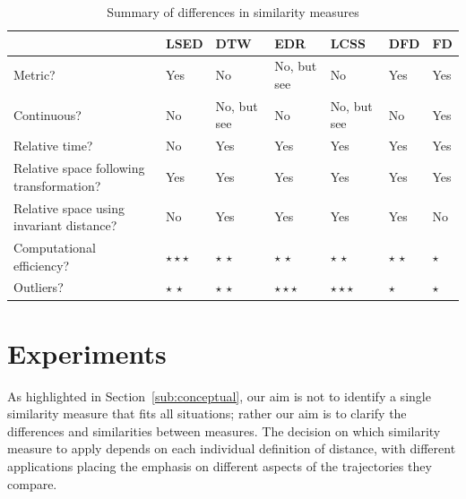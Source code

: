 \documentclass[10pt,letterpaper]{article}
\begin{document}
\begin{table}[htb]
    \caption{Summary of differences in similarity measures}\label{tab:key}
\renewcommand{\arraystretch}{2}
    \begin{tabular}{>{\raggedright\arraybackslash}p{2.8cm}|>{\raggedright\arraybackslash}p{1.25cm}>{\raggedright\arraybackslash}p{1.25cm}>{\raggedright\arraybackslash}p{1.25cm}>{\raggedright\arraybackslash}p{1.25cm}>{\raggedright\arraybackslash}p{1.25cm}p{1.25cm}}
~                                        & LSED     & DTW         & EDR         & LCSS        & DFD      & FD      \\ \hline
    Metric?                                  & Yes      & \cellcolor{gray!30}  No          & \cellcolor{gray!15} No, but see \cite{NgC04}& \cellcolor{gray!30} No          & Yes      & Yes     \\
    Continuous?                              & \cellcolor{gray!30} No       & \cellcolor{gray!15} No, but see \cite{b-cfdts-07} & \cellcolor{gray!30} No          & \cellcolor{gray!15} No, but see \cite{bbw-09} & \cellcolor{gray!30} No       & Yes     \\
    Relative time?                           & \cellcolor{gray!30} No       & Yes         & Yes         & Yes         & Yes      & Yes     \\
    Relative space following transformation? & Yes      & Yes         & Yes         & Yes         & Yes      & Yes     \\
    Relative space using invariant distance? & \cellcolor{gray!30} No       & Yes         & Yes         & Yes         & Yes      & \cellcolor{gray!30} No      \\
    Computational efficiency?                & $\star\star\star$  & \cellcolor{gray!15} $\star\,\star$    & \cellcolor{gray!15} $\star\,\star$    & \cellcolor{gray!15}$\star\,\star$    & \cellcolor{gray!15}$\star\,\star$ & \cellcolor{gray!30}$\star$ \\
    Outliers?                                & \cellcolor{gray!15}$\star\,\star$ & \cellcolor{gray!15}$\star\,\star$    & $\star\star\star$        & $\star\star\star$        & \cellcolor{gray!30} $\star$     & \cellcolor{gray!30} $\star$    \\
    \end{tabular}
\end{table}
	
\section{Experiments}
As highlighted in Section~\ref{sub:conceptual}, our aim is not to identify a single similarity measure that fits all situations; rather  our aim is to clarify  the differences and similarities between measures. The decision on which similarity measure to apply depends on each individual definition of distance, with different applications placing  the emphasis  on different aspects of the trajectories they compare. 
\end{document}
